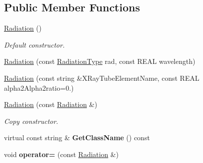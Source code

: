 \subsection*{Public Member Functions}
\begin{DoxyCompactItemize}
\item 
\mbox{\label{class_obj_cryst_1_1_radiation_abd533ac660e70618339636f18d1347f4}} 
\mbox{\hyperlink{class_obj_cryst_1_1_radiation_abd533ac660e70618339636f18d1347f4}{Radiation}} ()
\begin{DoxyCompactList}\small\item\em Default constructor. \end{DoxyCompactList}\item 
\mbox{\hyperlink{class_obj_cryst_1_1_radiation_ace67fea27bc640ac4820fc1ba73114d5}{Radiation}} (const \mbox{\hyperlink{namespace_obj_cryst_a48fe50a094c607f8897378934d3d73ef}{Radiation\+Type}} rad, const R\+E\+AL wavelength)
\item 
\mbox{\hyperlink{class_obj_cryst_1_1_radiation_a0302f8a0f706db01d0ada609c2e427d4}{Radiation}} (const string \&X\+Ray\+Tube\+Element\+Name, const R\+E\+AL alpha2\+Alpha2ratio=0.)
\item 
\mbox{\label{class_obj_cryst_1_1_radiation_ab08e37b8dd00149612aa656f1641a76f}} 
\mbox{\hyperlink{class_obj_cryst_1_1_radiation_ab08e37b8dd00149612aa656f1641a76f}{Radiation}} (const \mbox{\hyperlink{class_obj_cryst_1_1_radiation}{Radiation}} \&)
\begin{DoxyCompactList}\small\item\em Copy constructor. \end{DoxyCompactList}\item 
\mbox{\label{class_obj_cryst_1_1_radiation_acdbfa370aa6f670539697639e08f340c}} 
virtual const string \& {\bfseries Get\+Class\+Name} () const
\item 
\mbox{\label{class_obj_cryst_1_1_radiation_aaa4a0199b2d383fb69c0de13c62a024c}} 
void {\bfseries operator=} (const \mbox{\hyperlink{class_obj_cryst_1_1_radiation}{Radiation}} \&)
\item 
\mbox{\label{class_obj_cryst_1_1_radiation_ae369d0c6868a6291af6527ada096a768}} 

\end{DoxyCompactItemize}
